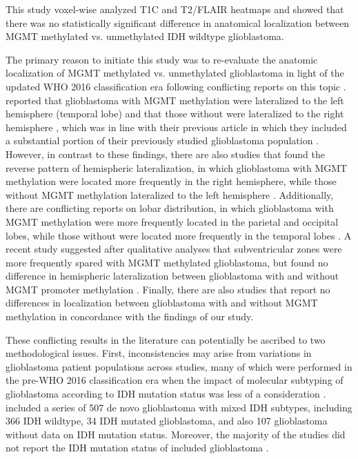 This study voxel-wise analyzed \gls{T1C} and \gls{T2}/\gls{FLAIR} heatmaps and showed that there was no statistically significant difference in anatomical localization between \gls{MGMT} methylated vs. unmethylated \gls{IDH} wildtype glioblastoma.

The primary reason to initiate this study was to re-evaluate the anatomic localization of \gls{MGMT} methylated vs. unmethylated glioblastoma in light of the updated \gls{WHO} 2016 classification era following conflicting reports on this topic \autocite{smits2017imaging}.
 reported that glioblastoma with \gls{MGMT} methylation were lateralized to the left hemisphere (temporal lobe) and that those without were lateralized to the right hemisphere \autocite{ellingson2013probabilistic}, which was in line with their previous article in which they included a substantial portion of their previously studied glioblastoma population \autocite{ellingson2012anatomic}.
However, in contrast to these findings, there are also studies that found the reverse pattern of hemispheric lateralization, in which glioblastoma with \gls{MGMT} methylation were located more frequently in the right hemisphere, while those without \gls{MGMT} methylation lateralized to the left hemisphere \autocite{wang2014anatomical}.
Additionally, there are conflicting reports on lobar distribution, in which glioblastoma with \gls{MGMT} methylation were more frequently located in the parietal and occipital lobes, while those without were located more frequently in the temporal lobes \autocite{eoli2007methylation}.
A recent study suggested after qualitative analyses that subventricular zones were more frequently spared with \gls{MGMT} methylated glioblastoma, but found no difference in hemispheric lateralization between glioblastoma with and without \gls{MGMT} promoter methylation \autocite{han2018structural}.
Finally, there are also studies that report no differences in localization between glioblastoma with and without \gls{MGMT} methylation \autocite{carillo2012relationship, drabycz2010analysis} in concordance with the findings of our study.

These conflicting results in the literature can potentially be ascribed to two methodological issues.
First, inconsistencies may arise from variations in glioblastoma patient populations across studies, many of which were performed in the pre-\gls{WHO} 2016 classification era when the impact of molecular subtyping of glioblastoma according to \gls{IDH} mutation status was less of a consideration \autocite{louis20162016}.
 included a series of 507 de novo glioblastoma with mixed \gls{IDH} subtypes, including 366 \gls{IDH} wildtype, 34 \gls{IDH} mutated glioblastoma, and also 107 glioblastoma without data on \gls{IDH} mutation status.
Moreover, the majority of the studies did not report the \gls{IDH} mutation status of included glioblastoma \autocite{ellingson2012anatomic,wang2014anatomical,eoli2007methylation,drabycz2010analysis}.


